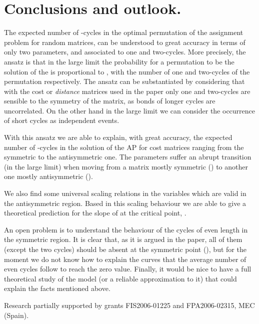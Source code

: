 \documentclass[]{iopart}
\begin{document}
\section{Conclusions and outlook.}

The expected number of -cycles in the optimal 
permutation of the assignment problem for random matrices,
can be understood to great accuracy in terms of only
two parameters,  and  associated to one and two-cycles.
More precisely, the ansatz is that in the large  limit
the probability for a permutation to be the solution of the  
is proportional to , with  the number
of one and two-cycles of the permutation respectively. 
The ansatz can be substantiated by considering that with the cost or 
{\it distance} matrices used in the paper only one and two-cycles
are sensible to the symmetry of the matrix, as bonds of longer cycles are 
uncorrelated. On the other hand in the large  limit we can consider
the occurrence of short cycles as independent events.  

With this ansatz we are able to explain, with great accuracy,
the expected number of -cycles in the solution of the AP for
cost matrices ranging from the symmetric to the antisymmetric one.  
The parameters suffer an abrupt 
transition (in the large  limit)
when moving from a matrix mostly symmetric ()
to another one mostly antisymmetric ().

We also find some universal scaling relations in the variables
which are valid in the antisymmetric region.
Based in this scaling behaviour we are able to give a 
theoretical prediction for the slope of  
at the critical point, .

An open problem is to understand the behaviour of the cycles of even 
length in the symmetric region. It is clear that, as it is argued
in the paper, all of them  (except the two cycles) should be absent 
at the symmetric point 
(), but for the moment we do not know
how to explain the curves that the average number 
of even cycles follow to reach the zero value.
Finally, it would be nice to have a full theoretical study of the model
(or a reliable approximation to it) that could 
explain the facts mentioned above.

 Research partially supported by
grants FIS2006-01225 and FPA2006-02315, MEC (Spain).
\end{document}
